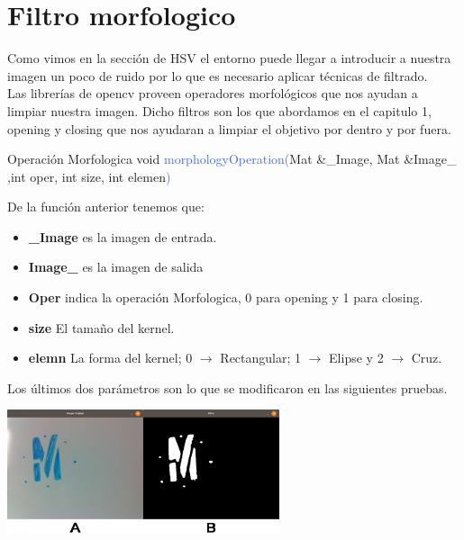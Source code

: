 \section{Filtro morfologico}
Como vimos en la sección de HSV el entorno puede llegar a introducir a nuestra
imagen un poco de ruido por lo que es necesario aplicar técnicas de filtrado.\\
Las librerías de opencv proveen operadores morfológicos que nos ayudan a limpiar
nuestra imagen.
Dicho filtros son los que abordamos en el capitulo 1, opening y closing que nos ayudaran
a limpiar el objetivo por dentro y por fuera.
\begin{example}[label={ex:serie}]{Operación Morfologica}
	\textcolor{Mulberry}{void} \textcolor{RoyalBlue}{morphologyOperation(}\textcolor{BurntOrange}{Mat}
	\textcolor{Mulberry}{\&}\textcolor{Bittersweet}{\_Image}, \textcolor{BurntOrange}{Mat} \textcolor{Mulberry}{\&}\textcolor{Bittersweet}{Image\_}
	,\textcolor{Mulberry}{int} \textcolor{Bittersweet}{oper}, \textcolor{Mulberry}{int} \textcolor{Bittersweet}{size},
	\textcolor{Mulberry}{int} \textcolor{Bittersweet}{elemen}\textcolor{RoyalBlue}{)}
\end{example}
De la función anterior tenemos que:
\begin{itemize}
	\item \textbf{\_Image} es la imagen de entrada.
	\item \textbf{Image\_} es la imagen de salida
	\item \textbf{Oper} indica la operación Morfologica, 0 para opening y 1 para closing.
	\item \textbf{size} El tamaño del kernel.
	\item \textbf{elemn} La forma del kernel; 0 $\rightarrow$ Rectangular; 1 $\rightarrow$ Elipse y
	      2 $\rightarrow$ Cruz.
\end{itemize}
Los últimos dos parámetros son lo que se modificaron en las siguientes pruebas.
\begin{center}
	\includegraphics[width=0.6\textwidth]{Contenido/Cuerpo/Capitulo4/Fig16.eps}
	\label{Fig9}
\end{center}
